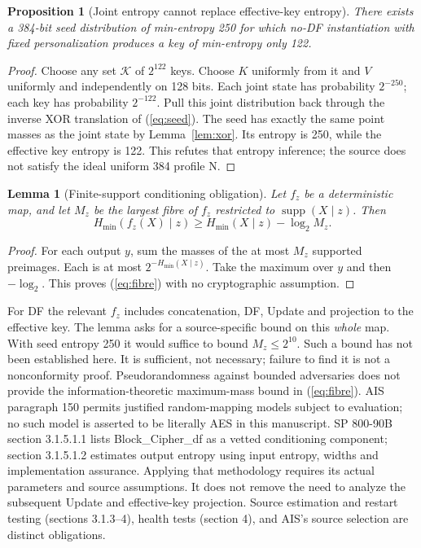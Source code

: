 \documentclass[11 pt,a 4 paper]{article}
\newtheorem{lemma}[theorem]{Lemma}
\newtheorem{proposition}[theorem]{Proposition}
\newcommand{\hm}{H_{\min}}
\begin{document}
\begin{proposition}[Joint entropy cannot replace effective-key entropy]\label{prop:counter}
There exists a 384-bit seed distribution of min-entropy 250 for which no-DF instantiation with fixed personalization produces a key of min-entropy only 122.
\end{proposition}
\begin{proof}
Choose any set $\mathcal K $ of $2^{122}$ keys. Choose $ K $ uniformly from it and $ V $ uniformly and independently on 128 bits. Each joint state has probability $2^{-250}$; each key has probability $2^{-122}$. Pull this joint distribution back through the inverse XOR translation of (\ref{eq:seed}). The seed has exactly the same point masses as the joint state by Lemma~\ref{lem:xor}. Its entropy is 250, while the effective key entropy is 122. This refutes that entropy inference; the source does not satisfy the ideal uniform 384 profile N.
\end{proof}

\begin{lemma}[Finite-support conditioning obligation]\label{lem:fibre}
Let $ f_z $ be a deterministic map, and let $ M_z $ be the largest fibre of $ f_z $ restricted to $\operatorname{supp}(X\mid z)$. Then
\begin{equation}\label{eq:fibre}
 \hm(f_z(X)\mid z)\geq\hm(X\mid z)-\log_2 M_z.
\end{equation}
\end{lemma}
\begin{proof}
For each output $ y $, sum the masses of the at most $ M_z $ supported preimages. Each is at most $2^{-\hm(X\mid z)}$. Take the maximum over $ y $ and then $-\log_2$. This proves (\ref{eq:fibre}) with no cryptographic assumption.
\end{proof}
For DF the relevant $ f_z $ includes concatenation, DF, Update and projection to the effective key. The lemma asks for a source-specific bound on this \emph{whole} map. With seed entropy 250 it would suffice to bound $ M_z\leq 2^{10}$. Such a bound has not been established here. It is sufficient, not necessary; failure to find it is not a nonconformity proof. Pseudorandomness against bounded adversaries does not provide the information-theoretic maximum-mass bound in (\ref{eq:fibre}). AIS paragraph 150 permits justified random-mapping models subject to evaluation; no such model is asserted to be literally AES in this manuscript. SP 800-90B section 3.1.5.1.1 lists Block\_Cipher\_df as a vetted conditioning component; section 3.1.5.1.2 estimates output entropy using input entropy, widths and implementation assurance. Applying that methodology requires its actual parameters and source assumptions. It does not remove the need to analyze the subsequent Update and effective-key projection. Source estimation and restart testing (sections 3.1.3--4), health tests (section 4), and AIS's source selection are distinct obligations.
\end{document}
